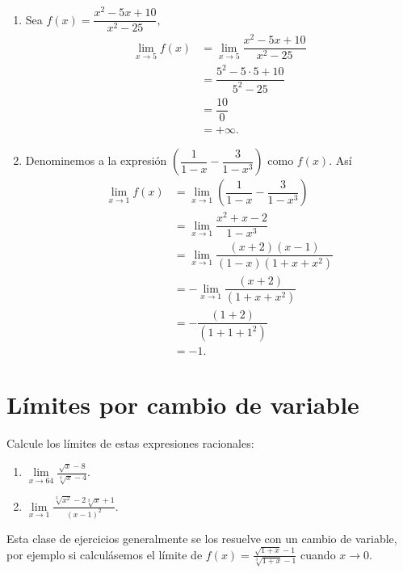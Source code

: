 \begin{example}
	\begin{enumerate}
		\item Sea \(f(x)=\dfrac{x^2-5x+10}{x^2-25},\)
		\begin{align*}
		\lim\limits_{x\to 5}f(x)&=\lim\limits_{x\to 5}\dfrac{x^2-5x+10}{x^2-25}\\
		&=\dfrac{5^2-5\cdot 5+10}{5^2-25}\\
		&=\dfrac{10}{0}\\
		&=+\infty.
		\end{align*}
		
		\item Denominemos a la expresi\'on  \(\left(\dfrac{1}{1-x}-\dfrac{3}{1-x^3}\right)\) como \(f(x).\) As\'i
		\begin{align*}
		\lim\limits_{x\to 1}f(x)&=\lim\limits_{x\to 1}\left(\dfrac{1}{1-x}-\dfrac{3}{1-x^3}\right)\\
		&=\lim\limits_{x\to 1}\dfrac{x^2+x-2}{1-x^3}\\
		&=\lim\limits_{x\to 1}\dfrac{(x+2)(x-1)}{(1-x)(1+x+x^2)}\\
		&=-\lim\limits_{x\to 1}\dfrac{(x+2)}{(1+x+x^2)}\\
		&=-\dfrac{(1+2)}{(1+1+1^2)}\\
		&=-1.
		\end{align*}
	\end{enumerate}
\end{example}

\section*{L\'imites por cambio de variable}



\begin{exercise}
	Calcule los l\'imites de estas  expresiones racionales:
	\begin{enumerate}
		\item \(\lim\limits_{x\to 64}\frac{\sqrt{x}-8}{\sqrt[3]{x}-4}.\)
		\item \(\lim\limits_{x\to 1}\frac{\sqrt[3]{x^2}-2\sqrt[3]{x}+1}{(x-1)^2}.\)
	\end{enumerate}
\end{exercise}
Esta clase de ejercicios generalmente se los resuelve con un cambio de variable, por ejemplo si calcul\'asemos el l\'imite de \(f(x)=\frac{\sqrt{1+x}-1}{\sqrt[3]{1+x}-1}\) cuando \(x\to 0.\)\newline

